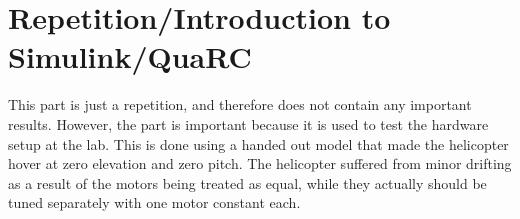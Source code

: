 \section{Repetition/Introduction to Simulink/QuaRC}\label{sec:prob1}

This part is just a repetition, and therefore does not contain any important results. However, the part is important because it is used to test the hardware setup at the lab. This is done using a handed out model that made the helicopter hover at zero elevation and zero pitch. The helicopter suffered from minor drifting as a result of the motors being treated as equal, while they actually should be tuned separately with one motor constant each. 